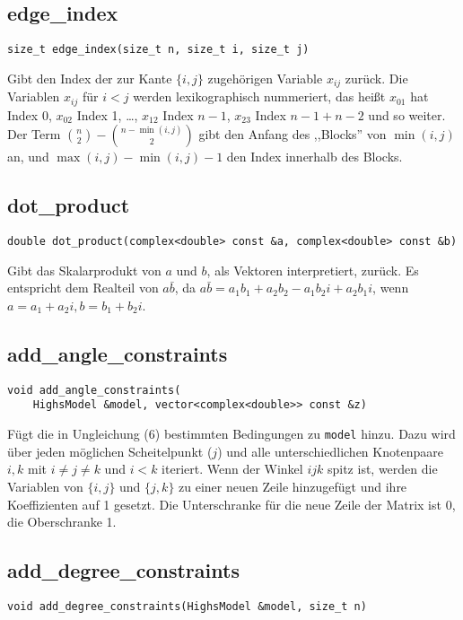 \documentclass[a4paper, 10pt, ngerman]{article}
\begin{document}
\subsection{edge\_index}

\verb|size_t edge_index(size_t n, size_t i, size_t j)|
\medskip

\noindent Gibt den Index der zur Kante $\{i, j\}$ zugehörigen Variable $x_{ij}$ zurück. Die Variablen $x_{ij}$ für $i < j$ werden lexikographisch nummeriert, das heißt $x_{01}$ hat Index 0, $x_{02}$ Index 1, \dots, $x_{12}$ Index $n - 1$, $x_{23}$ Index $n - 1 + n - 2$ und so weiter. Der Term $\binom n 2 - \binom {n - \min(i, j)} 2$ gibt den Anfang des ,,Blocks'' von $\min(i, j)$ an, und $\max(i, j) - \min(i, j) - 1$ den Index innerhalb des Blocks.

\subsection{dot\_product}
\verb|double dot_product(complex<double> const &a, complex<double> const &b)|
\medskip

\noindent Gibt das Skalarprodukt von $a$ und $b$, als Vektoren interpretiert, zurück. Es entspricht dem Realteil von $a \bar b$, da $a \bar b = a_1 b_1 + a_2 b_2 - a_1 b_2 i + a_2 b_1 i$, wenn $a = a_1 + a_2 i, b = b_1 + b_2 i$.

\subsection{add\_angle\_constraints}
\verb|void add_angle_constraints(| \\
\verb|    HighsModel &model, vector<complex<double>> const &z)|
\medskip

\noindent Fügt die in Ungleichung (6) bestimmten Bedingungen zu \verb|model| hinzu. Dazu wird über jeden möglichen Scheitelpunkt ($j$) und alle unterschiedlichen Knotenpaare $i, k$ mit $i \ne j \ne k$ und $i < k$ iteriert. Wenn der Winkel $ijk$ spitz ist, werden die Variablen von $\{i, j\}$ und $\{j, k\}$ zu einer neuen Zeile hinzugefügt und ihre Koeffizienten auf 1 gesetzt. Die Unterschranke für die neue Zeile der Matrix ist 0, die Oberschranke 1.

\subsection{add\_degree\_constraints}
\verb|void add_degree_constraints(HighsModel &model, size_t n)|
\medskip
\end{document}
